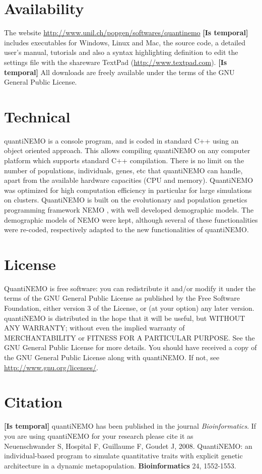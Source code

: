 \documentclass[letterpaper,12pt,oneside]{book}
\newcommand{\tbc}[1]{\small {\bf \color{red} [Is temporal]} \normalsize} %
\begin{document}
\section{Availability}
The website \linebreak\url{http://www.unil.ch/popgen/softwares/quantinemo} \tbc{} includes executables for Windows, Linux and Mac, the source code, a detailed user's manual, tutorials and also a syntax highlighting definition to edit the settings file with the shareware TextPad (\linebreak\url{http://www.textpad.com}).  \tbc{} All downloads are freely available under the terms of the GNU General Public License.

\section{Technical}
quantiNEMO is a console program, and is coded in standard C++ using an object oriented approach. This allows compiling quantiNEMO on any computer platform which supports standard C++ compilation. There is no limit on the number of populations, individuals, genes, etc that quantiNEMO can handle, apart from the available hardware capacities (CPU and memory). QuantiNEMO was optimized for high computation efficiency in particular for large simulations on clusters. QuantiNEMO is built on the evolutionary and population genetics programming framework NEMO \citep{Guillaume_2006}, with well developed demographic models. The demographic models of NEMO were kept, although several of these functionalities were re-coded, respectively adapted to the new functionalities of quantiNEMO.

\section{License}
QuantiNEMO is free software: you can redistribute it and/or modify it under the terms of the GNU General Public License as published by the Free Software Foundation, either version 3 of the License, or (at your option) any later version. quantiNEMO is distributed in the hope that it will be useful, but WITHOUT ANY WARRANTY; without even the implied warranty of MERCHANTABILITY or FITNESS FOR A PARTICULAR PURPOSE.  See the GNU General Public License for more details. You should have received a copy of the GNU General Public License along with quantiNEMO. If not, see \linebreak\url{http://www.gnu.org/licenses/}.

\section{Citation}
\tbc{}
quantiNEMO has been published in the journal \textit{Bioinformatics}. If you are using quantiNEMO for your research please cite it as \\
 Neuenschwander S, Hospital F, Guillaume F, Goudet J, 2008. QuantiNEMO: an individual-based program to simulate quantitative traits with explicit genetic architecture in a dynamic metapopulation. \textbf{Bioinformatics} 24, 1552-1553.
\end{document}

